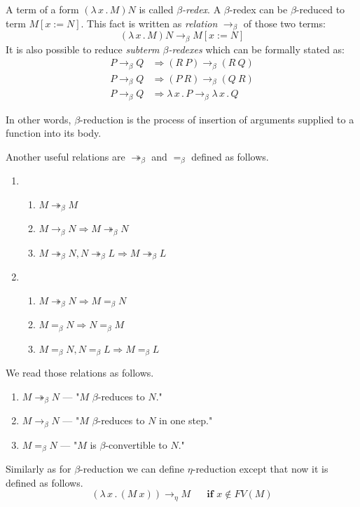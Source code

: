 \documentclass[11pt]{article}
\newcommand{\then}{\Rightarrow\xspace}
\newcommand{\lamb}[2]{( \lambda \, #1 \, . \, #2 )}
\newcommand{\lam}[2]{\lambda \, #1 \, . \, #2}
\newcommand{\bbarr}{\twoheadrightarrow_\beta}
\newcommand{\barr}{\rightarrow_\beta}
\newcommand{\beq}{=_\beta}
\newcommand{\bRedex}{$\beta$-redex\xspace}
\newcommand{\bRedexes}{$\beta$-redexes\xspace}
\newcommand{\bArrow}{\rightarrow_\beta\xspace}
\newcommand{\eArrow}{\rightarrow_\eta\xspace}
\begin{document}
\begin{article}
A term of a form $\lamb{x}{M}N$ is called \textit{\bRedex}.
A \bRedex can be $\beta$-reduced to term $M[x:=N]$. 
This fact is written as \textit{relation} $\bArrow$ 
of those two terms:
\begin{equation} \label{eq:bRed}
\lamb{x}{M}N \bArrow M[x:=N]
\end{equation}
It is also possible to reduce \textit{subterm \bRedexes} 
which can be formally stated as:
\begin{align*}
P \bArrow Q &\then (R~P)      \bArrow (R~Q) \\
P \bArrow Q &\then (P~R)      \bArrow (Q~R) \\
P \bArrow Q &\then \lam{x}{P} \bArrow \lam{x}{Q}  
\end{align*}

In other words, $\beta$-reduction is the process 
of insertion of arguments supplied to a function into 
its body.

Another useful relations are $\bbarr$ and $\beq$ defined as follows. 

\begin{enumerate}
 \item \begin{enumerate}
 	\item $M \bbarr M$
 	\item $M \barr N \then M \bbarr N$
 	\item $M \bbarr N , N \bbarr L \then M \bbarr L$ 	
 \end{enumerate}
 \item \begin{enumerate}
 	\item $M \bbarr N \then M \beq N$
 	\item $M \beq N \then N \beq M$
 	\item $M \beq N , N \beq L \then M \beq L$
 \end{enumerate}

\end{enumerate}

We read those relations as follows.
\begin{enumerate}
 	\item $M \bbarr N$ --- "$M$ $\beta$-reduces to $N$."  
 	\item $M \barr N$  --- "$M$ $\beta$-reduces to $N$
 	      in one step."
 	\item $M \beq N$ --- "$M$ is $\beta$-convertible to $N$."	
 \end{enumerate}


Similarly as for $\beta$-reduction we can define $\eta$-reduction except that now it is defined as follows.  
$$\lamb{x}{(M~x)} \eArrow M \textbf{ ~~~~if } x \not\in FV(M) $$


\end{article}
\end{document}
